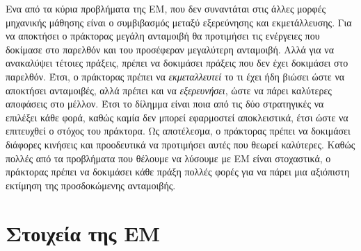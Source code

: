 Ενα από τα κύρια προβλήματα της ΕΜ, που δεν συναντάται στις άλλες μορφές μηχανικής μάθησης είναι
ο συμβιβασμός μεταξύ εξερεύνησης και εκμετάλλευσης. Για να αποκτήσει ο πράκτορας μεγάλη ανταμοιβή
θα προτιμήσει τις ενέργειες που δοκίμασε στο παρελθόν και του προσέφεραν μεγαλύτερη ανταμοιβή. Αλλά
για να ανακαλύψει τέτοιες πράξεις, πρέπει να δοκιμάσει πράξεις που δεν έχει δοκιμάσει στο παρελθόν.
Έτσι, ο πράκτορας πρέπει να \textit{εκμεταλλευτεί} το τι έχει ήδη βιώσει ώστε να αποκτήσει ανταμοιβές,
αλλά πρέπει και να \textit{εξερευνήσει}, ώστε να πάρει καλύτερες αποφάσεις στο μέλλον. Έτσι το δίλημμα
είναι ποια από τις δύο στρατηγικές να επιλέξει κάθε φορά, καθώς καμία δεν μπορεί εφαρμοστεί αποκλειστικά,
έτσι ώστε να επιτευχθεί ο στόχος του πράκτορα. Ως αποτέλεσμα, ο πράκτορας πρέπει να δοκιμάσει διάφορες
κινήσεις και προοδευτικά να προτιμήσει αυτές που θεωρεί καλύτερες. Καθώς πολλές από τα προβλήματα που
θέλουμε να λύσουμε με ΕΜ είναι στοχαστικά, ο πράκτορας πρέπει να δοκιμάσει κάθε πράξη πολλές φορές
για να πάρει μια αξιόπιστη εκτίμηση της προσδοκώμενης ανταμοιβής.


\section{Στοιχεία της ΕΜ}

